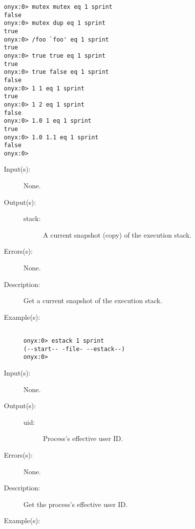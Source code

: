 \begin{description}
\begin{description}
\begin{verbatim}
onyx:0> mutex mutex eq 1 sprint
false
onyx:0> mutex dup eq 1 sprint
true
onyx:0> /foo `foo' eq 1 sprint
true
onyx:0> true true eq 1 sprint
true
onyx:0> true false eq 1 sprint
false
onyx:0> 1 1 eq 1 sprint
true
onyx:0> 1 2 eq 1 sprint
false
onyx:0> 1.0 1 eq 1 sprint
true
onyx:0> 1.0 1.1 eq 1 sprint
false
onyx:0>
		\end{verbatim}
	\end{description}
\label{systemdict:estack}
\item[{\onyxop{--}{estack}{stack}}: ]
	\begin{description}\item[]
	\item[Input(s): ] None.
	\item[Output(s): ]
		\begin{description}\item[]
		\item[stack: ]
			A current snapshot (copy) of the execution stack.
		\end{description}
	\item[Errors(s): ] None.
	\item[Description: ]
		Get a current snapshot of the execution stack.
	\item[Example(s): ]\begin{verbatim}

onyx:0> estack 1 sprint
(--start-- -file- --estack--)
onyx:0>
		\end{verbatim}
	\end{description}
\label{systemdict:euid}
\item[{\onyxop{--}{euid}{uid}}: ]
	\begin{description}\item[]
	\item[Input(s): ] None.
	\item[Output(s): ]
		\begin{description}\item[]
		\item[uid: ]
			Process's effective user ID.
		\end{description}
	\item[Errors(s): ] None.
	\item[Description: ]
		Get the process's effective user ID.
	\item[Example(s): ]\begin{verbatim}


\end{verbatim}
\end{description}
\end{description}
